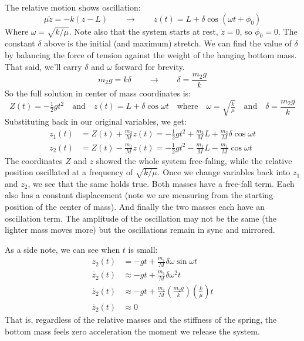 \documentclass[12pt]{article}
\begin{document}
{The relative motion shows oscillation:
$$
\mu \ddot{z} = - k \left( z - L \right)
\quad\quad\rightarrow\quad\quad
z(t) = L + \delta \cos ( \omega t + \phi_0 )
$$
Where $\omega=\sqrt{k/\mu}$. Note also that the system starts at rest, $\dot{z}=0$, so $\phi_0=0$. The constant $\delta$ above is the initial (and maximum) stretch. We can find the value of $\delta$ by balancing the force of tension against the weight of the hanging bottom mass. That said, we'll carry $\delta$ and $\omega$ forward for brevity.
$$
m_2 g = k \delta
\quad\quad\rightarrow\quad\quad
\delta = \frac{m_2 g}{k}
$$
So the full solution in center of mass coordinates is:
$$
Z(t) = -\tfrac{1}{2} g t^2
\quad\text{and}\quad
z(t) = L + \delta \cos \omega t 
\quad\text{where}\quad
\omega=\sqrt{\tfrac{k}{\mu}}
\quad\text{and}\quad
\delta = \frac{m_2 g}{k}
$$
Substituting back in our original variables, we get:
\begin{align*}
    z_1(t) &= Z(t) + \frac{m_2}{M} z(t) = -\tfrac{1}{2} g t^2 + \frac{m_2}{M} L + \frac{m_2}{M} \delta \cos \omega t \\
    z_2(t) &= Z(t) - \frac{m_1}{M} z(t) = -\tfrac{1}{2} g t^2 - \frac{m_1}{M}L - \frac{m_1}{M} \cos \omega t
\end{align*}
The coordinates $Z$ and $z$ showed the whole system free-faling, while the relative position oscillated at a frequency of $\sqrt{k/\mu}$. Once we change variables back into $z_1$ and $z_2$, we see that the same holds true. Both masses have a free-fall term. Each also has a constant displacement (note we are measuring from the starting position of the center of mass). And finally the two masses each have an oscillation term. The amplitude of the oscillation may not be the same (the lighter mass moves more) but the oscillations remain in sync and mirrored.

As a side note, we can see when $t$ is small:
\begin{align*}
    \dot{z_2}(t) &= -g t + \frac{m_1}{M} \delta \omega \sin \omega t \\
    \dot{z_2}(t) &\approx -gt + \frac{m_1}{M} \delta \omega^2 t \\
    \dot{z_2}(t) &\approx -gt + \frac{m_1}{M} \left( \frac{m_2 g}{k} \right) \left( \frac{k}{\mu} \right) t \\
    \dot{z_2}(t) &\approx 0
\end{align*}
That is, regardless of the relative masses and the stiffness of the spring, the bottom mass feels zero acceleration the moment we release the system.

}
\end{document}
